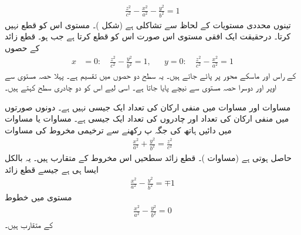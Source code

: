 \begin{align}\label{مساوات_سمتیہ_دو_چادری_قطع_زائد}
\frac{z^2}{c^2}-\frac{x^2}{a^2}-\frac{y^2}{b^2}=1
\end{align}
تینوں محددی مستویات کے لحاظ سے تشاکلی ہے (شکل )۔ مستوی  اس کو قطع  نہیں کرتا۔ درحقیقت ایک افقی مستوی اس صورت اس کو قطع کرتا ہے جب  ہو۔ قطع زائد  کے حصوں
 \begin{align*}
x&=0:\quad\frac{z^2}{c^2}-\frac{y^2}{b^2}=1,&& y=0:\quad \frac{z^2}{c^2}-\frac{x^2}{a^2}=1
\end{align*}
کے راس اور ماسکے محور  پر پائے  جاتے ہیں۔ یہ سطح دو حصوں میں تقسیم ہے۔ پہلا حصہ مستوی   سے اوپر اور دوسرا حصہ مستوی   سے نیچے پایا جاتا ہے۔ اسی لیے اس کو دو چادری سطح کہتے ہیں۔

مساوات  اور مساوات  میں منفی ارکان کی تعداد ایک جیسی  نہیں ہے۔ دونوں  صورتوں میں منفی ارکان  کی تعداد اور چادروں کی تعداد ایک جیسی   ہے۔   مساوات   یا   مساوات  میں دائیں ہاتھ  کی جگہ   پ رکھنے سے ترخیمی مخروط کی مساوات
\begin{align*}
\frac{x^2}{a^2}+\frac{y^2}{b^2}=\frac{z^2}{c^2}
\end{align*}
حاصل ہوتی ہے (مساوات )۔ قطع زائد سطحیں اس مخروط کے متقارب ہیں۔ یہ بالکل ایسا ہی ہے جیسے قطع زائد
\begin{align*}
\frac{x^2}{a^2}-\frac{y^2}{b^2}=\mp 1
\end{align*}
مستوی  میں  خطوط
\begin{align*}
\frac{x^2}{a^2}-\frac{y^2}{b^2}=0
\end{align*}
کے متقارب ہیں۔

